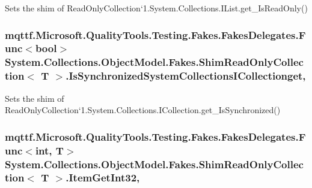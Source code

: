 Sets the shim of Read\-Only\-Collection`1.System.\-Collections.\-I\-List.\-get\-\_\-\-Is\-Read\-Only()

\hypertarget{class_system_1_1_collections_1_1_object_model_1_1_fakes_1_1_shim_read_only_collection_3_01_t_01_4_a91174d7f0b707df285ea4982a1c6e516}{
\subsubsection[{Is\-Synchronized\-System\-Collections\-I\-Collectionget}]{\setlength{\rightskip}{0pt plus 5cm}mqttf.\-Microsoft.\-Quality\-Tools.\-Testing.\-Fakes.\-Fakes\-Delegates.\-Func$<$bool$>$ System.\-Collections.\-Object\-Model.\-Fakes.\-Shim\-Read\-Only\-Collection$<$ T $>$.Is\-Synchronized\-System\-Collections\-I\-Collectionget\hspace{0.3cm}{\ttfamily [get]}, {\ttfamily [set]}}}\label{class_system_1_1_collections_1_1_object_model_1_1_fakes_1_1_shim_read_only_collection_3_01_t_01_4_a91174d7f0b707df285ea4982a1c6e516}


Sets the shim of Read\-Only\-Collection`1.System.\-Collections.\-I\-Collection.\-get\-\_\-\-Is\-Synchronized()

\hypertarget{class_system_1_1_collections_1_1_object_model_1_1_fakes_1_1_shim_read_only_collection_3_01_t_01_4_a4e4c56e70edcb02ae73ab0c40637fb6d}{
\subsubsection[{Item\-Get\-Int32}]{\setlength{\rightskip}{0pt plus 5cm}mqttf.\-Microsoft.\-Quality\-Tools.\-Testing.\-Fakes.\-Fakes\-Delegates.\-Func$<$int, T$>$ System.\-Collections.\-Object\-Model.\-Fakes.\-Shim\-Read\-Only\-Collection$<$ T $>$.Item\-Get\-Int32\hspace{0.3cm}{\ttfamily [get]}, {\ttfamily [set]}}}\label{class_system_1_1_collections_1_1_object_model_1_1_fakes_1_1_shim_read_only_collection_3_01_t_01_4_a4e4c56e70edcb02ae73ab0c40637fb6d}


